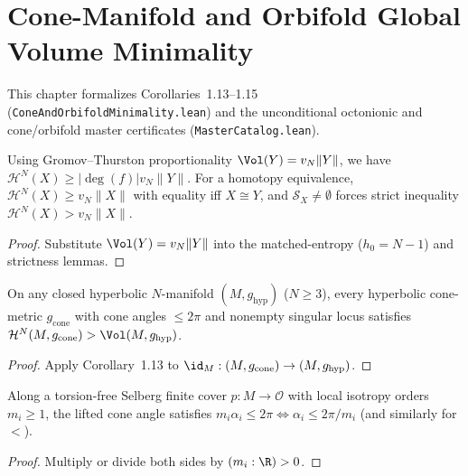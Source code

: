 \chapter{Cone-Manifold and Orbifold Global Volume Minimality}

This chapter formalizes Corollaries~1.13--1.15 (\texttt{ConeAndOrbifoldMinimality.lean}) and the
unconditional octonionic and cone/orbifold master certificates (\texttt{MasterCatalog.lean}).

\begin{corollary}
\label{cor_cone_simplicial_volume}
\leanok
{}
Using Gromov--Thurston proportionality $\Vol(Y) = v_N \|Y\|$, we have $\mathcal{H}^N(X) \ge |\deg(f)| v_N \|Y\|$.
For a homotopy equivalence, $\mathcal{H}^N(X) \ge v_N \|X\|$ with equality iff $X \cong Y$, and
$\mathcal{S}_X \neq \emptyset$ forces strict inequality $\mathcal{H}^N(X) > v_N \|X\|$.
\end{corollary}
\begin{proof}\leanok
Substitute $\Vol(Y) = v_N \|Y\|$ into the matched-entropy ($h_0 = N - 1$) and strictness lemmas.
\end{proof}

\begin{corollary}
\label{cor_cone_manifold_volume}
\leanok
{}
On any closed hyperbolic $N$-manifold $(M, g_{\mathrm{hyp}})$ ($N \ge 3$), every hyperbolic cone-metric
$g_{\mathrm{cone}}$ with cone angles $\le 2\pi$ and nonempty singular locus satisfies
$\mathcal{H}^N(M, g_{\mathrm{cone}}) > \Vol(M, g_{\mathrm{hyp}})$.
\end{corollary}
\begin{proof}\leanok
Apply Corollary~1.13 to $\id_M : (M, g_{\mathrm{cone}}) \to (M, g_{\mathrm{hyp}})$.
\end{proof}

\begin{lemma}
\label{lem_selberg_cone_unwrap}
\leanok
Along a torsion-free Selberg finite cover $p : M \to \mathcal{O}$ with local isotropy orders
$m_i \ge 1$, the lifted cone angle satisfies $m_i \alpha_i \le 2\pi \iff \alpha_i \le 2\pi / m_i$
(and similarly for $<$).
\end{lemma}
\begin{proof}\leanok
Multiply or divide both sides by $(m_i : \R) > 0$.
\end{proof}

